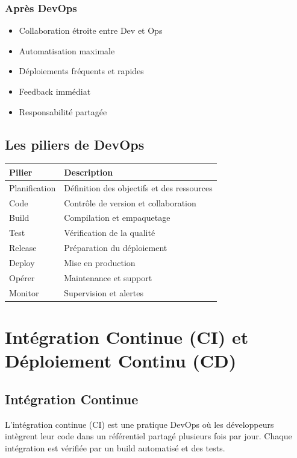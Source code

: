 \documentclass[12pt,a4paper]{report}
\begin{document}
\subsubsection{Après DevOps}

\begin{itemize}
    \item Collaboration étroite entre Dev et Ops
    \item Automatisation maximale
    \item Déploiements fréquents et rapides
    \item Feedback immédiat
    \item Responsabilité partagée
\end{itemize}

\subsection{Les piliers de DevOps}

\begin{table}[h]
\centering
\begin{tabular}{|l|p{4cm}|}
\hline
\textbf{Pilier} & \textbf{Description} \\
\hline
Planification & Définition des objectifs et des ressources \\
Code & Contrôle de version et collaboration \\
Build & Compilation et empaquetage \\
Test & Vérification de la qualité \\
Release & Préparation du déploiement \\
Deploy & Mise en production \\
Opérer & Maintenance et support \\
Monitor & Supervision et alertes \\
\hline
\end{tabular}
\end{table}

\newpage

\section{Intégration Continue (CI) et Déploiement Continu (CD)}

\subsection{Intégration Continue}

L'intégration continue (CI) est une pratique DevOps où les développeurs intègrent leur code dans un référentiel partagé plusieurs fois par jour. Chaque intégration est vérifiée par un build automatisé et des tests.
\end{document}
